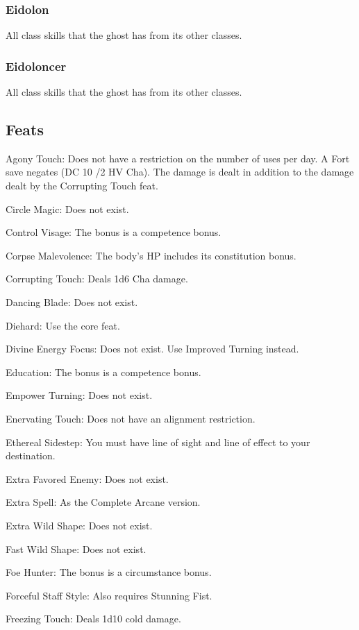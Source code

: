\subsubsection{Eidolon}
 All class skills that the ghost has from its other classes.
\subsubsection{Eidoloncer}
 All class skills that the ghost has from its other classes.
\subsection{Feats}
\begin{itemize*}
\item Agony Touch: Does not have a restriction on the number of uses per day. A Fort save negates (DC 10 /2 HV \add Cha). The damage is dealt in addition to the damage dealt by the Corrupting Touch feat.
\item Circle Magic: Does not exist.
\item Control Visage: The bonus is a competence bonus. 
\item Corpse Malevolence: The body's HP includes its constitution bonus.
\item Corrupting Touch: Deals 1d6 \add Cha damage.
\item Dancing Blade: Does not exist.
\item Diehard: Use the core feat.
\item Divine Energy Focus: Does not exist. Use Improved Turning instead.
\item Education: The bonus is a competence bonus.
\item Empower Turning: Does not exist.
\item Enervating Touch: Does not have an alignment restriction.
\item Ethereal Sidestep: You must have line of sight and line of effect to your destination.
\item Extra Favored Enemy: Does not exist.
\item Extra Spell: As the Complete Arcane version.
\item Extra Wild Shape: Does not exist.
\item Fast Wild Shape: Does not exist.
\item Foe Hunter: The bonus is a circumstance bonus.
\item Forceful Staff Style: Also requires Stunning Fist.
\item Freezing Touch: Deals 1d10 cold damage.

\end{itemize*}
